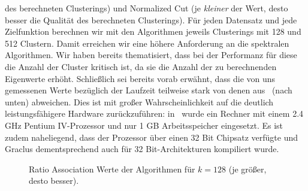 des berechneten Clusterings) und Normalized Cut (je \emph{kleiner} der Wert, desto besser die Qualität des berechneten
Clusterings). Für jeden Datensatz und jede Zielfunktion berechnen wir mit den Algorithmen jeweils Clusterings mit 128
und 512 Clustern. Damit erreichen wir eine höhere Anforderung an die spektralen Algorithmen. Wir haben bereits thematisiert, dass
bei der Performanz für diese die Anzahl der Cluster kritisch ist, da sie die Anzahl der zu berechnenden Eigenwerte erhöht.
Schließlich sei bereits vorab erwähnt, dass die von uns gemessenen Werte bezüglich der Laufzeit teilweise stark von denen
aus~\cite{DhillonGK07} (nach unten) abweichen. Dies ist mit großer Wahrscheinlichkeit auf die deutlich leistungsfähigere 
Hardware zurückzuführen: in~\cite{DhillonGK07} wurde ein Rechner mit einem 2.4 GHz Pentium IV-Prozessor und nur 1 GB
Arbeitsspeicher eingesetzt. Es ist zudem naheliegend, dass der Prozessor über einen 32 Bit Chipsatz verfügte und Graclus
dementsprechend auch für 32 Bit-Architekturen kompiliert wurde.

\begin{figure}[ht!]
	\centering
\caption{Ratio Association Werte der Algorithmen für $k = 128$ (je größer, desto besser).}
\label{fig:experiment-experiment-kkmpp-ratioassoc-128}
\end{figure}

